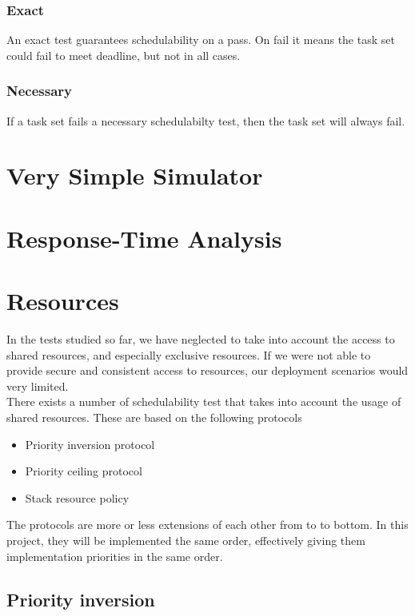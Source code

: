 \documentclass{acm_proc_article-sp}
\begin{document}
\subsubsection*{Exact}
An exact test guarantees schedulability on a pass. On fail it means the task set could fail to meet deadline, but not in all cases.
\subsubsection*{Necessary}
If a task set fails a necessary schedulabilty test, then the task set will always fail.



\section{Very Simple Simulator}


\section{Response-Time Analysis}
\label{sec:rta}



\section{Resources}
In the tests studied so far, we have neglected to take into account the access to shared resources, and especially exclusive resources. If we were not able to provide secure and consistent access to resources, our deployment scenarios would very limited.\\
There exists a number of schedulability test that takes into account the usage of shared resources. These are based on the following protocols
\begin{itemize}
\item Priority inversion protocol
\item Priority ceiling protocol
\item Stack resource policy
\end{itemize}
The protocols are more or less extensions of each other from to to bottom. In this project, they will be implemented the same order, effectively giving them implementation priorities in the same order.

\subsection{Priority inversion}
\end{document}
